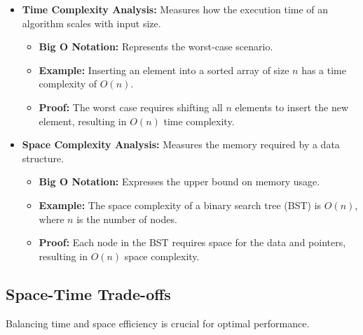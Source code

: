 \documentclass[12pt]{book} %
\begin{document}
\begin{itemize}
    \item \textbf{Time Complexity Analysis:} Measures how the execution time of an algorithm scales with input size.
    \begin{itemize}
        \item \textbf{Big O Notation:} Represents the worst-case scenario.
        \item \textbf{Example:} Inserting an element into a sorted array of size \(n\) has a time complexity of \(O(n)\).
        \item \textbf{Proof:} The worst case requires shifting all \(n\) elements to insert the new element, resulting in \(O(n)\) time complexity.
    \end{itemize}
    \item \textbf{Space Complexity Analysis:} Measures the memory required by a data structure.
    \begin{itemize}
        \item \textbf{Big O Notation:} Expresses the upper bound on memory usage.
        \item \textbf{Example:} The space complexity of a binary search tree (BST) is \(O(n)\), where \(n\) is the number of nodes.
        \item \textbf{Proof:} Each node in the BST requires space for the data and pointers, resulting in \(O(n)\) space complexity.
    \end{itemize}
\end{itemize}

\subsection{Space-Time Trade-offs}
Balancing time and space efficiency is crucial for optimal performance.
\end{document}
